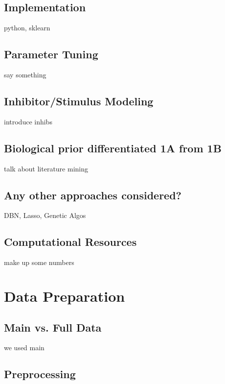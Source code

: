 \documentclass[letterpaper, 11pt]{article}
\begin{document}
\subsection{Implementation}

python, sklearn

\subsection{Parameter Tuning}

say something

\subsection{Inhibitor/Stimulus Modeling}

introduce inhibs

\subsection{Biological prior differentiated 1A from 1B}

talk about literature mining

\subsection{Any other approaches considered?}

DBN, Lasso, Genetic Algos

\subsection{Computational Resources}

make up some numbers

\section{Data Preparation}

\subsection{Main vs. Full Data}

we used main

\subsection{Preprocessing}
\end{document}
